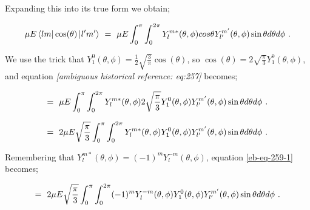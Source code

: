 \documentclass{article}
\begin{document}
Expanding this into its true form we obtain; 

\begin{equation} \label{eb-eq-261-1}
\mu E\bra{l m}\cos(\theta)\ket{l' m'} \hspace{0.125cm} = \hspace{0.125cm} \mu E \int_{0}^{\pi} \int_{0}^{2\pi} Y_{l}^{m \ast}(\theta, \phi) cos\theta Y_{l'}^{m'}(\theta, \phi) \sin\theta d\theta d\phi \hspace{0.125cm} . 
\end{equation}

We use the trick that \begin{math} Y_{1}^{0}(\theta, \phi)  = \frac{1}{2}\sqrt{\frac{3}{\pi}}\cos(\theta) \end{math}, so \begin{math} \cos(\theta) = {2}\sqrt{\frac{\pi}{3}} Y_{1}^{0}(\theta, \phi)  \end{math}, and equation \textit{[ambiguous historical reference: eq:257]} becomes; 

\begin{equation} \label{eb-eq-262-1}
= \hspace{0.125cm} \mu E \int_{0}^{\pi} \int_{0}^{2\pi} Y_{l}^{m \ast}(\theta, \phi) {2}\sqrt{\frac{\pi}{3}} Y_{1}^{0}(\theta, \phi) Y_{l'}^{m'}(\theta, \phi) \sin\theta d\theta d\phi \hspace{0.125cm} . 
\end{equation}

\begin{equation} \label{eb-eq-263-1}
= \hspace{0.125cm} 2 \mu E \sqrt{\frac{\pi}{3}} \int_{0}^{\pi} \int_{0}^{2\pi} Y_{l}^{m \ast}(\theta, \phi) Y_{1}^{0}(\theta, \phi) Y_{l'}^{m'}(\theta, \phi) \sin\theta d\theta d\phi \hspace{0.125cm} . 
\end{equation}

Remembering that \begin{math} Y_{l}^{m \ast}(\theta, \phi)  =  (-1)^{m} Y_{l}^{-m}(\theta, \phi)  \end{math}, equation \ref{eb-eq-259-1} becomes;

\begin{equation} \label{eb-eq-264-1}
= \hspace{0.125cm} 2 \mu E \sqrt{\frac{\pi}{3}} \int_{0}^{\pi} \int_{0}^{2\pi} (-1)^{m} Y_{l}^{-m}(\theta, \phi) Y_{1}^{0}(\theta, \phi) Y_{l'}^{m'}(\theta, \phi) \sin\theta d\theta d\phi \hspace{0.125cm} . 
\end{equation}
\end{document}
